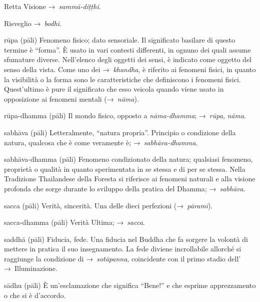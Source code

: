 \begin{glossarydescription}

\item[Retta Visione] →~\emph{sammā-diṭṭhi}.

\item[Risveglio] →~\emph{bodhi}.

\item[rūpa] (pāli) Fenomeno fisico; dato sensoriale. Il significato basilare di
  questo termine è ``forma''. È usato in vari contesti differenti, in ognuno dei
  quali assume sfumature diverse. Nell'elenco degli oggetti dei sensi, è
  indicato come oggetto del senso della vista. Come uno dei →~\emph{khandha}, è
  riferito ai fenomeni fisici, in quanto la visibilità o la forma sono le
  caratteristiche che definiscono i fenomeni fisici. Quest'ultimo è pure il
  significato che esso veicola quando viene usato in opposizione ai fenomeni
  mentali (→~\emph{nāma}).

\item[rūpa-dhamma] (pāli) Il mondo fisico, opposto a \emph{nāma-dhamma};
  →~\emph{rūpa}, \emph{nāma}.


\item[sabhāva] (pāli) Letteralmente, ``natura propria''. Principio o condizione
  della natura, qualcosa che è come veramente è; →~\emph{sabhāva-dhamma}.

\item[sabhāva-dhamma] (pāli) Fenomeno condizionato della natura; qualsiasi
  fenomeno, proprietà o qualità in quanto sperimentata in se stessa e di per se
  stessa. Nella Tradizione Thailandese della Foresta si riferisce ai fenomeni
  naturali e alla visione profonda che sorge durante lo sviluppo della pratica
  del Dhamma; →~\emph{sabhāva}.

\item[sacca] (pāli) Verità, sincerità. Una delle dieci perfezioni
  (→~\emph{pāramī}).

\item[sacca-dhamma] (pāli) Verità Ultima; →~\emph{sacca}.

\item[saddhā] (pāli) Fiducia, fede. Una fiducia nel Buddha che fa sorgere la
  volontà di mettere in pratica il suo insegnamento. La fede diviene
  incrollabile allorché si raggiunge la condizione di →~\emph{sotāpanna},
  coincidente con il primo stadio dell' →~Illuminazione.

\item[sādhu] (pāli) È un'esclamazione che significa ``Bene!'' e che esprime
  apprezzamento o che si è d'accordo.


\end{glossarydescription}
